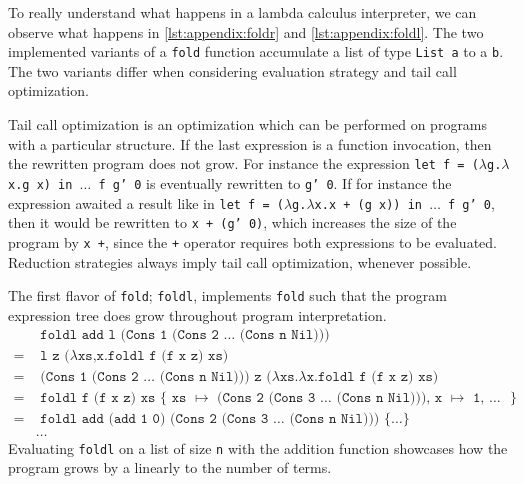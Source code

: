 To really understand what happens in a lambda calculus interpreter, we can observe what happens in \autoref{lst:appendix:foldr} and \autoref{lst:appendix:foldl}.
The two implemented variants of a \texttt{fold} function accumulate a list of type \texttt{List a} to a \texttt{b}.
The two variants differ when considering evaluation strategy and tail call optimization.
\begin{remark}\label{remark:tailcall}
	Tail call optimization is an optimization which can be performed on programs with a particular structure.
	If the last expression is a function invocation, then the rewritten program does not grow.
	For instance the expression \texttt{let f = ($\lambda$g.$\lambda$x.g x) in $\dots$ f g' 0} is eventually rewritten to \texttt{g' 0}.
	If for instance the expression awaited a result like in \texttt{let f = ($\lambda$g.$\lambda$x.x + (g x)) in $\dots$ f g' 0}, then it would be rewritten to \texttt{x + (g' 0)}, which increases the size of the program by \texttt{x +}, since the \texttt{+} operator requires both expressions to be evaluated.
	Reduction strategies always imply tail call optimization, whenever possible.
\end{remark}

The first flavor of \texttt{fold}; \texttt{foldl}, implements \texttt{fold} such that the program expression tree does grow throughout program interpretation.
\begin{align}
	  & \texttt{ foldl add l (Cons 1 (Cons 2 $\dots$ (Cons n Nil)))}                                                                \\
	= & \texttt{ l z ($\lambda$xs,x.foldl f (f x z) xs)}  \tag*{}                                                                   \\
	= & \texttt{ (Cons 1 (Cons 2 $\dots$ (Cons n Nil))) z ($\lambda$xs.$\lambda$x.foldl f (f x z) xs)}  \tag*{}                              \\
	= & \texttt{ foldl f (f x z) xs $\{$ xs $\mapsto$ (Cons 2 (Cons 3 $\dots$ (Cons n Nil))), x $\mapsto$ 1, $\dots$ $\}$}  \tag*{} \\
	= & \texttt{ foldl add (add 1 0) (Cons 2 (Cons 3 $\dots$ (Cons n Nil))) $\{ \dots \}$}  \tag*{}                                 \\
	  & \dots \tag*{}
\end{align}
Evaluating \texttt{foldl} on a list of size \texttt{n} with the addition function showcases how the program grows by a linearly to the number of terms.

